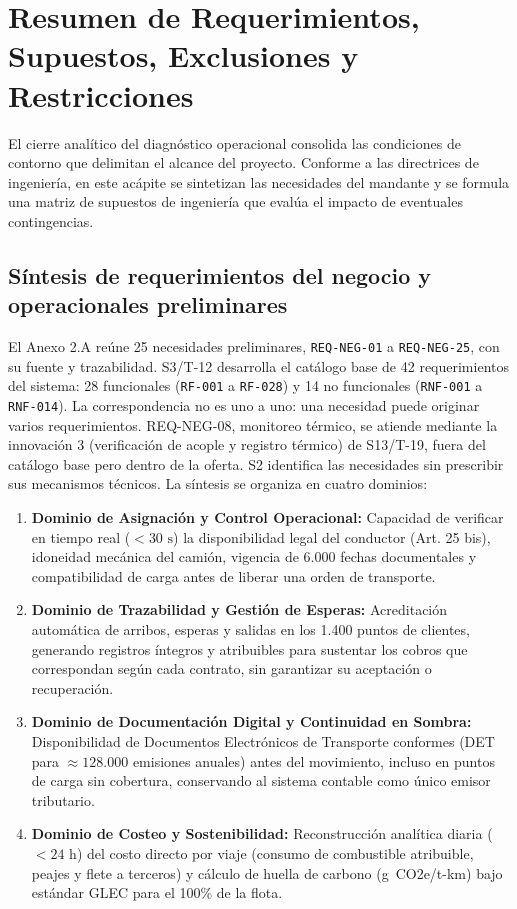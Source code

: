 \section{Resumen de Requerimientos, Supuestos, Exclusiones y Restricciones}\label{sec:2-requerimientos}

El cierre analítico del diagnóstico operacional consolida las condiciones de contorno que delimitan el alcance del proyecto. Conforme a las directrices de ingeniería, en este acápite se sintetizan las necesidades del mandante y se formula una matriz de supuestos de ingeniería que evalúa el impacto de eventuales contingencias.

\subsection{Síntesis de requerimientos del negocio y operacionales preliminares}\label{sec:2-req-sintesis}

El Anexo 2.A reúne 25 necesidades preliminares, \texttt{REQ-NEG-01} a \texttt{REQ-NEG-25}, con su fuente y trazabilidad. S3/T-12 desarrolla el catálogo base de 42 requerimientos del sistema: 28 funcionales (\texttt{RF-001} a \texttt{RF-028}) y 14 no funcionales (\texttt{RNF-001} a \texttt{RNF-014}). La correspondencia no es uno a uno: una necesidad puede originar varios requerimientos. REQ-NEG-08, monitoreo térmico, se atiende mediante la innovación 3 (verificación de acople y registro térmico) de S13/T-19, fuera del catálogo base pero dentro de la oferta. S2 identifica las necesidades sin prescribir sus mecanismos técnicos. La síntesis se organiza en cuatro dominios:

\begin{enumerate}
  \item \textbf{Dominio de Asignación y Control Operacional:} Capacidad de verificar en tiempo real ($< 30\text{ s}$) la disponibilidad legal del conductor (Art. 25 bis), idoneidad mecánica del camión, vigencia de 6.000 fechas documentales y compatibilidad de carga antes de liberar una orden de transporte.
  \item \textbf{Dominio de Trazabilidad y Gestión de Esperas:} Acreditación automática de arribos, esperas y salidas en los 1.400 puntos de clientes, generando registros íntegros y atribuibles para sustentar los cobros que correspondan según cada contrato, sin garantizar su aceptación o recuperación.
  \item \textbf{Dominio de Documentación Digital y Continuidad en Sombra:} Disponibilidad de Documentos Electrónicos de Transporte conformes (DET para $\approx 128.000$ emisiones anuales) antes del movimiento, incluso en puntos de carga sin cobertura, conservando al sistema contable como único emisor tributario.
  \item \textbf{Dominio de Costeo y Sostenibilidad:} Reconstrucción analítica diaria ($< 24\text{ h}$) del costo directo por viaje (consumo de combustible atribuible, peajes y flete a terceros) y cálculo de huella de carbono (g~CO2e/t-km) bajo estándar GLEC para el 100\% de la flota.
\end{enumerate}

